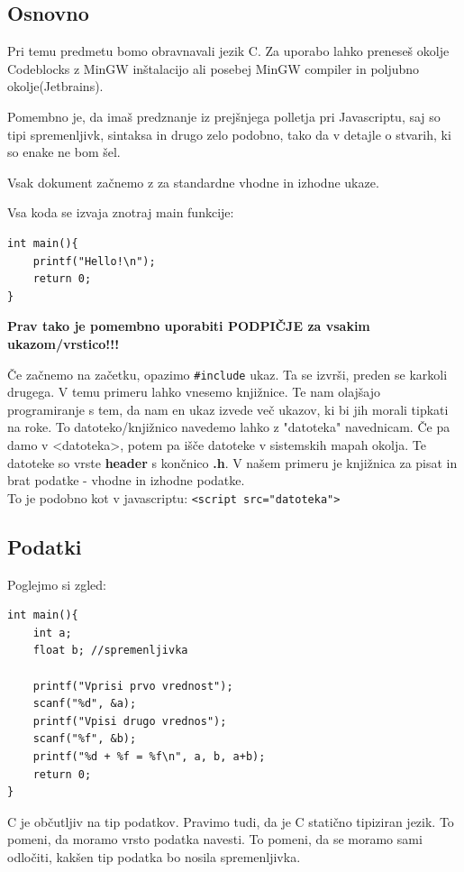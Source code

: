 \documentclass[a4paper, 12pt]{article}
\begin{document}
\subsection{Osnovno}

Pri temu predmetu bomo obravnavali jezik C. Za uporabo lahko preneseš okolje Codeblocks z MinGW inštalacijo ali posebej MinGW compiler in poljubno okolje(Jetbrains).\

Pomembno je, da imaš predznanje iz prejšnjega polletja pri Javascriptu, saj so tipi spremenljivk, sintaksa in drugo zelo podobno, tako da v detajle o stvarih, ki so enake ne bom šel.

Vsak dokument začnemo z  za standardne vhodne in izhodne ukaze.

Vsa koda se izvaja znotraj main funkcije:

\begin{lstlisting}
int main(){
    printf("Hello!\n");
    return 0;
}
\end{lstlisting}

\textbf{Prav tako je pomembno uporabiti PODPIČJE za vsakim ukazom/vrstico!!!}

Če začnemo na začetku, opazimo \texttt{\#include} ukaz. Ta se izvrši, preden se karkoli drugega. V temu primeru lahko vnesemo knjižnice. Te nam olajšajo programiranje s tem, da nam en ukaz izvede več ukazov, ki bi jih morali tipkati na roke. To datoteko/knjižnico navedemo lahko z "datoteka" navednicam. Če pa damo v <datoteka>, potem pa išče datoteke v sistemskih mapah okolja. Te datoteke so vrste \textbf{header} s končnico \textbf{.h}. V našem primeru je knjižnica za pisat in brat podatke - vhodne in izhodne podatke.\\
To je podobno kot v javascriptu:  \lstinline|<script src="datoteka">|\ 
\subsection{Podatki}
Poglejmo si zgled:
\begin{lstlisting}[caption = Branje in pisanje podatkov]
int main(){
	int a;
	float b; //spremenljivka

	printf("Vprisi prvo vrednost");
	scanf("%d", &a);
	printf("Vpisi drugo vrednos");
	scanf("%f", &b);
	printf("%d + %f = %f\n", a, b, a+b);
	return 0;
}
\end{lstlisting}

C je občutljiv na tip podatkov. Pravimo tudi, da je C statično tipiziran jezik. To pomeni, da moramo vrsto podatka navesti. 
To pomeni, da se moramo sami odločiti, kakšen tip podatka bo nosila spremenljivka.
\end{document}
